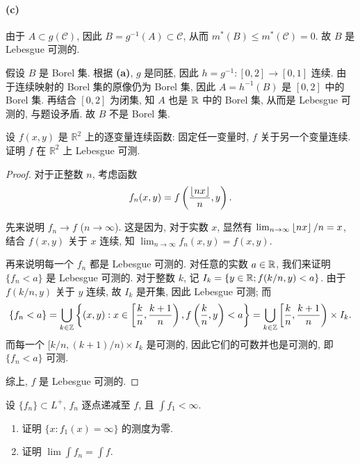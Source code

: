 \documentclass{article}
\begin{document}
\begin{solution}
	\paragraph{(c)} 由于 $A \subset g(\mathcal{C})$, 因此 $B = g^{-1}(A) \subset \mathcal{C}$, 从而 $m^*(B) \le m^*(\mathcal{C}) = 0$. 故 $B$ 是 Lebesgue 可测的.

	假设 $B$ 是 Borel 集. 根据 \textbf{(a)}, $g$ 是同胚, 因此 $h = g^{-1}: [0,2] \to [0,1]$ 连续. 由于连续映射的 Borel 集的原像仍为 Borel 集, 因此 $A = h^{-1}(B)$ 是 $[0,2]$ 中的 Borel 集. 再结合 $[0,2]$ 为闭集, 知 $A$ 也是 $\mathbb{R}$ 中的 Borel 集, 从而是 Lebesgue 可测的, 与题设矛盾. 故 $B$ 不是 Borel 集.
\end{solution}



\begin{problem}
  设 $f(x,y)$ 是 $\mathbb{R}^2$ 上的逐变量连续函数: 固定任一变量时, $f$ 关于另一个变量连续. 证明 $f$ 在 $\mathbb{R}^2$ 上 Lebesgue 可测.
\end{problem}

\begin{proof}
	对于正整数 $n$, 考虑函数 
	\[ f_n(x, y) = f\left( \frac{\left\lfloor nx \right\rfloor}{n}, y \right).  \]

	先来说明 $f_n \to f$ ($n \to \infty$). 这是因为, 对于实数 $x$, 显然有 $\lim_{n \to \infty} \left\lfloor nx \right\rfloor/n = x$, 结合 $f(x, y)$ 关于 $x$ 连续, 知 $\lim_{n \to \infty}f_n(x, y) = f(x, y)$.

	再来说明每一个 $f_n$ 都是 Lebesgue 可测的. 对任意的实数 $a \in \mathbb{R}$, 我们来证明 $\{f_n < a\}$ 是 Lebesgue 可测的. 对于整数 $k$, 记 $I_k = \{y \in \mathbb{R}; f(k/n, y) < a\}$. 由于 $f(k/n, y)$ 关于 $y$ 连续, 故 $I_k$ 是开集, 因此 Lebesgue 可测; 而
	\[ \{f_n < a\} = \bigcup_{k \in \mathbb{Z}}^{} \left\{ (x, y): x \in \left[ \frac{k}{n}, \frac{k+1}{n} \right), f\left( \frac{k}{n}, y \right) < a \right\}
	= \bigcup_{k \in \mathbb{Z}}^{} \left[ \frac{k}{n}, \frac{k+1}{n} \right) \times I_k. \]
	而每一个 $[k/n,(k+1)/n) \times I_k$ 是可测的, 因此它们的可数并也是可测的, 即 $\{f_n < a\}$ 可测.

	综上, $f$ 是 Lebesgue 可测的.
\end{proof}



\begin{problem}
  设 $\{f_n\}\subset L^+$, $f_n$ 逐点递减至 $f$, 且 $\int f_1<\infty$.
  \begin{enumerate}
    \item[(a)] 证明 $\{x:f_1(x)=\infty\}$ 的测度为零.
    \item[(b)] 证明 $\lim\int f_n=\int f$.
  \end{enumerate}
\end{problem}
\end{document}
